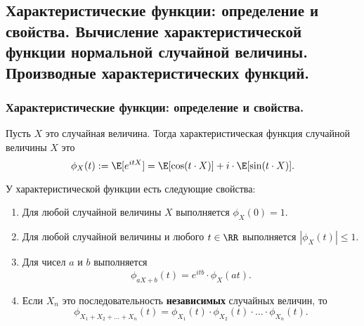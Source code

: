 \subsection{Характеристические функции: определение и свойства. Вычисление характеристической функции нормальной случайной величины. Производные характеристических функций.}

\subsubsection{Характеристические функции: определение и свойства.}

\begin{definition*}
    Пусть $X$ это случайная величина. Тогда характеристическая функция случайной величины $X$ это
    \begin{equation*}
        \phi_X(t) := \E[e^{itX}] = \E[\cos (t \cdot X)] + i \cdot \E[\sin (t \cdot X)].
    \end{equation*}
\end{definition*}

\begin{theorem*}
    У характеристической функции есть следующие свойства:
    \begin{enumerate}
    \item
        Для любой случайной величины $X$ выполняется $\phi_X(0) = 1$.
        
    \item 
        Для любой случайной величины и любого $t \in \RR$ выполняется $|\phi_X(t)| \leq 1$.

    \item 
        Для чисел $a$ и $b$ выполняется
        \begin{equation*}
            \phi_{aX + b}(t) = e^{itb} \cdot \phi_X(at).
        \end{equation*}

    \item 
        Если $X_n$ это последовательность \textbf{независимых} случайных величин, то
        \begin{equation*}
            \phi_{X_1 + X_2 + \dots + X_n}(t) = \phi_{X_1}(t) \cdot \phi_{X_2}(t) \cdot \dots \cdot \phi_{X_n}(t).
        \end{equation*}
    \end{enumerate}
\end{theorem*} 

